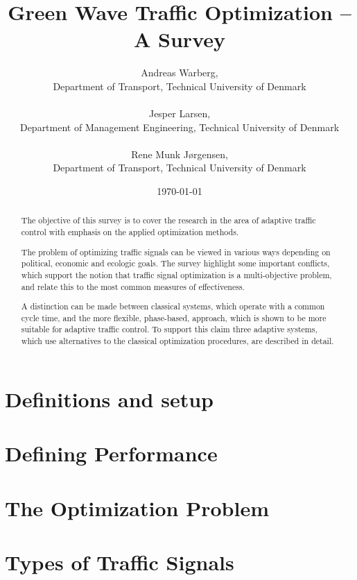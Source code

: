\documentclass [a4paper, 10pt]{article}
\title{Green Wave Traffic Optimization -- A Survey}
\author{Andreas Warberg,\\ Department of Transport, Technical University of Denmark\\ ~ \\ 
Jesper Larsen,\\ Department of Management Engineering, Technical University of Denmark\\ ~ \\ Rene Munk J{\o}rgensen,\\ Department of Transport, Technical University of Denmark}
\date{\today}
\begin{document}
\setlength{\parindent}{4mm}

\maketitle

\begin{abstract}
The objective of this survey is to cover the research in the area of
adaptive traffic control with emphasis on the applied optimization
methods.

The problem of optimizing traffic signals can be viewed in various
ways depending on political, economic and ecologic goals. The survey
highlight some important conflicts, which support the notion that
traffic signal optimization is a multi-objective problem, and relate
this to the most common measures of effectiveness.

A distinction can be made between classical systems, which operate
with a common cycle time, and the more flexible, phase-based,
approach, which is shown to be more suitable for adaptive traffic
control. To support this claim three adaptive systems, which use
alternatives to the classical optimization procedures, are described
in detail.
\end{abstract}



\section{Definitions and setup}


%

\section{Defining Performance}


\section{The Optimization Problem}


\section{Types of Traffic Signals}

\end{document}

